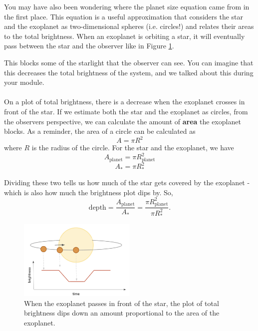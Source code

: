 \documentclass[14pt]{article}
\begin{document}
\noindent You may have also been wondering where the planet size equation came from in the first place. This equation is a useful approximation that considers the star and the exoplanet as two-dimensional spheres (i.e. circles!) and relates their areas to the total brightness. When an exoplanet is orbiting a star, it will eventually pass between the star and the observer like in Figure \ref{fig:area1}. 

\noindent This blocks some of the starlight that the observer can see. You can imagine that this decreases the total brightness of the system, and we talked about this during your module.
\\\\
\noindent On a plot of total brightness, there is a decrease when the exoplanet crosses in front of the star. If we estimate both the star and the exoplanet as circles, from the observers perspective, we can calculate the amount of \textbf{area} the exoplanet blocks. As a reminder, the area of a circle can be calculated as
\begin{equation}
    A = \pi R^2
\end{equation}
\noindent where $R$ is the radius of the circle. For the star and the exoplanet, we have
\begin{equation}
    A_{\text{planet}} = \pi R_{\text{planet}}^2
\end{equation}
\begin{equation}
    A_* = \pi R_*^2
\end{equation}

\noindent Dividing these two tells us how much of the star gets covered by the exoplanet - which is also how much the brightness plot dips by. So, 
\begin{equation}
    \text{depth} = \frac{A_{\text{planet}}}{A_*} = \frac{\pi R_{\text{planet}}^2}{\pi R_*^2}.
\end{equation}

\begin{figure}[h]
    \centering
    \includegraphics[width=0.5\textwidth]{exo_area2.png}
    \caption{When the exoplanet passes in front of the star, the plot of total brightness dips down an amount proportional to the area of the exoplanet.}
    \label{fig:area1}
\end{figure}
\end{document}
